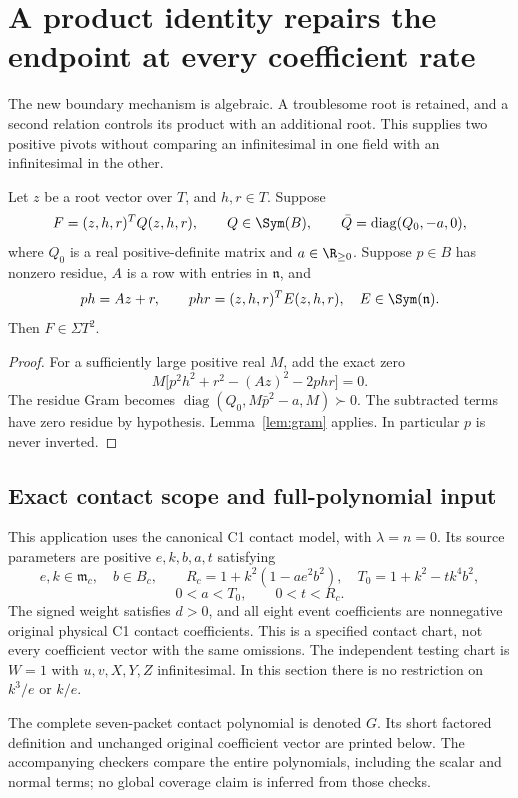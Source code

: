 \section{A product identity repairs the endpoint at every coefficient rate}\label{sec:productrepair}
The new boundary mechanism is algebraic. A troublesome root is retained, and a second relation controls its product with an additional root. This supplies two positive pivots without comparing an infinitesimal in one field with an infinitesimal in the other.

\begin{lemma}\label{lem:productrepair}
Let $z$ be a root vector over $T$, and $h,r\in T$. Suppose
\[
F=(z,h,r)^TQ(z,h,r),\qquad Q\in\Sym(B),\qquad
\bar Q=\operatorname{diag}(Q_0,-a,0),
\]
where $Q_0$ is a real positive-definite matrix and $a\in\R_{\ge0}$. Suppose $p\in B$ has nonzero residue, $A$ is a row with entries in $\mathfrak n$, and
\[
ph=Az+r,\qquad phr=(z,h,r)^TE(z,h,r),\quad E\in\Sym(\mathfrak n).
\]
Then $F\in\Sigma T^2$.
\end{lemma}
\begin{proof}
For a sufficiently large positive real $M$, add the exact zero
\[
M\big[p^2h^2+r^2-(Az)^2-2phr\big]=0.
\]
The residue Gram becomes $\operatorname{diag}(Q_0,M\bar p^2-a,M)\succ0$. The subtracted terms have zero residue by hypothesis. Lemma~\ref{lem:gram} applies. In particular $p$ is never inverted.
\end{proof}

\subsection{Exact contact scope and full-polynomial input}
This application uses the canonical C1 contact model, with $\lambda=n=0$. Its source parameters are positive $e,k,b,a,t$ satisfying
\[
e,k\in\mathfrak m_c,\quad b\in B_c,\qquad
R_c=1+k^2(1-ae^2b^2),\quad T_0=1+k^2-tk^4b^2,
\]
\[
0<a<T_0,\qquad0<t<R_c.
\]
The signed weight satisfies $d>0$, and all eight event coefficients are nonnegative original physical C1 contact coefficients. This is a specified contact chart, not every coefficient vector with the same omissions. The independent testing chart is $W=1$ with $u,v,X,Y,Z$ infinitesimal. In this section there is no restriction on $k^3/e$ or $k/e$.

The complete seven-packet contact polynomial is denoted $G$. Its short factored definition and unchanged original coefficient vector are printed below. The accompanying checkers compare the entire polynomials, including the scalar and normal terms; no global coverage claim is inferred from those checks.

